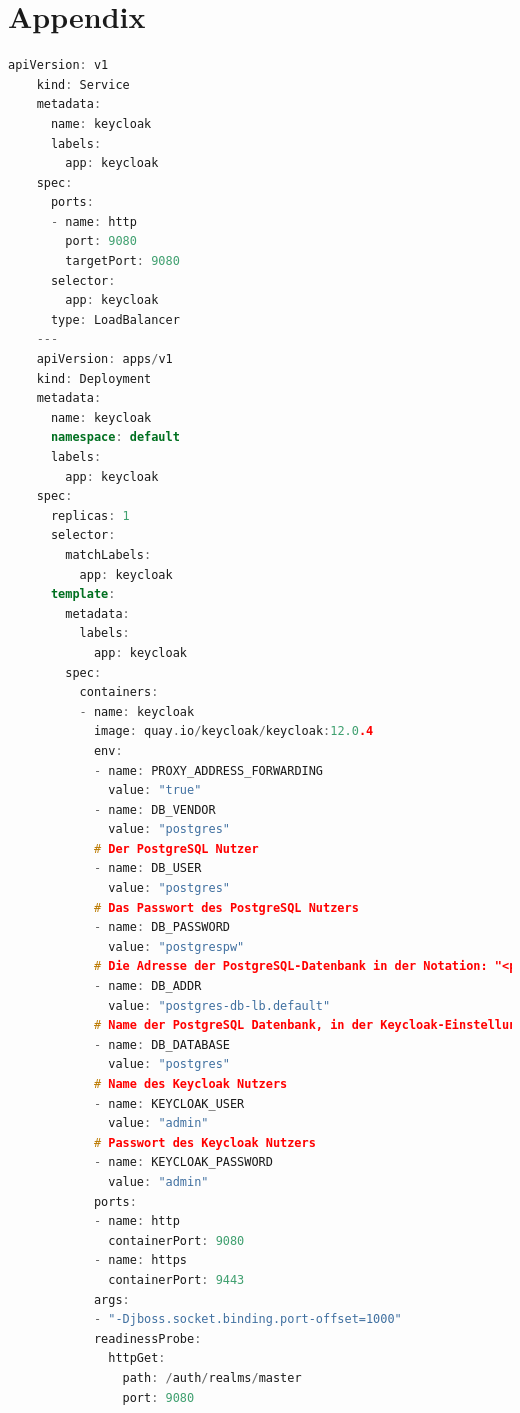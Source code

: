\chapter{Appendix}
\label{Appendix}

\begin{lstlisting}[language=C++,frame=tb,caption={Deployment und Service von Keycloak},label=lst:DeploymentundServicevonKeycloak]
    apiVersion: v1
    kind: Service
    metadata:
      name: keycloak
      labels:
        app: keycloak
    spec:
      ports:
      - name: http
        port: 9080
        targetPort: 9080
      selector:
        app: keycloak
      type: LoadBalancer
    ---
    apiVersion: apps/v1
    kind: Deployment
    metadata:
      name: keycloak
      namespace: default
      labels:
        app: keycloak
    spec:
      replicas: 1
      selector:
        matchLabels:
          app: keycloak
      template:
        metadata:
          labels:
            app: keycloak
        spec:
          containers:
          - name: keycloak
            image: quay.io/keycloak/keycloak:12.0.4
            env:
            - name: PROXY_ADDRESS_FORWARDING
              value: "true"
            - name: DB_VENDOR
              value: "postgres"
            # Der PostgreSQL Nutzer
            - name: DB_USER
              value: "postgres"
            # Das Passwort des PostgreSQL Nutzers
            - name: DB_PASSWORD
              value: "postgrespw"
            # Die Adresse der PostgreSQL-Datenbank in der Notation: "<postgres-service-name>"."<namespace>"
            - name: DB_ADDR
              value: "postgres-db-lb.default"
            # Name der PostgreSQL Datenbank, in der Keycloak-Einstellungen gespeichert werden
            - name: DB_DATABASE
              value: "postgres"
            # Name des Keycloak Nutzers
            - name: KEYCLOAK_USER
              value: "admin"
            # Passwort des Keycloak Nutzers
            - name: KEYCLOAK_PASSWORD
              value: "admin"
            ports:
            - name: http
              containerPort: 9080
            - name: https
              containerPort: 9443
            args:
            - "-Djboss.socket.binding.port-offset=1000"
            readinessProbe:
              httpGet:
                path: /auth/realms/master
                port: 9080    
  \end{lstlisting}
  \bigskip

